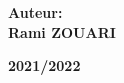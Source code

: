 \begin{titlepage}
\begin{center}
\begin{doublespacing}
        {\Large\textbf{Auteur:}\\}
       {\Large\textbf{Rami ZOUARI}\\}
       \vspace{2.5 mm}
       

     
     \vspace{8 mm}
        
     {\large\textbf{2021/2022}}
    
    \end{doublespacing}

   \end{center}
\end{titlepage}
